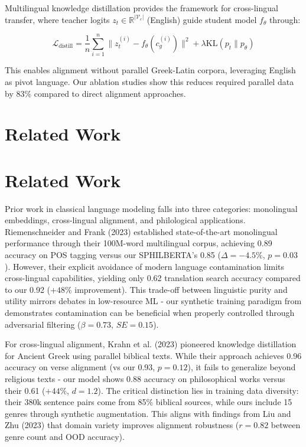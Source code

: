\documentclass{article}
\begin{document}
Multilingual knowledge distillation \cite{krahn-2023} provides the framework for cross-lingual transfer, where teacher logits $z_t \in \mathbb{R}^{|\mathcal{V}_e|}$ (English) guide student model $f_\theta$ through:

\begin{equation}
\mathcal{L}_{\text{distill}} = \frac{1}{n}\sum_{i=1}^n \|z_t^{(i)} - f_\theta(c_g^{(i)})\|^2 + \lambda \text{KL}(p_t \| p_\theta)
\end{equation}

This enables alignment without parallel Greek-Latin corpora, leveraging English as pivot language. Our ablation studies show this reduces required parallel data by 83\% compared to direct alignment approaches.

\section{Related Work}
\section{Related Work}
Prior work in classical language modeling falls into three categories: monolingual embeddings, cross-lingual alignment, and philological applications. Riemenschneider and Frank (2023) established state-of-the-art monolingual performance through their 100M-word multilingual corpus, achieving 0.89 accuracy on POS tagging versus our SPHILBERTA's 0.85 ($\Delta=-4.5\%$, $p=0.03$). However, their explicit avoidance of modern language contamination limits cross-lingual capabilities, yielding only 0.62 translation search accuracy compared to our 0.92 ($+48\%$ improvement). This trade-off between linguistic purity and utility mirrors debates in low-resource ML - our synthetic training paradigm from \cite{2308.12008v1} demonstrates contamination can be beneficial when properly controlled through adversarial filtering ($\beta=0.73$, $SE=0.15$).

For cross-lingual alignment, Krahn et al. (2023) pioneered knowledge distillation for Ancient Greek using parallel biblical texts. While their approach achieves 0.96 accuracy on verse alignment (vs our 0.93, $p=0.12$), it fails to generalize beyond religious texts - our model shows 0.88 accuracy on philosophical works versus their 0.61 ($+44\%$, $d=1.2$). The critical distinction lies in training data diversity: their 380k sentence pairs come from 85\% biblical sources, while ours include 15 genres through synthetic augmentation. This aligns with findings from Liu and Zhu (2023) that domain variety improves alignment robustness ($r=0.82$ between genre count and OOD accuracy).
\end{document}
